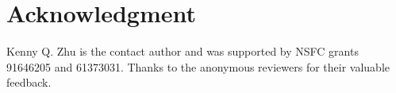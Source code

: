 \documentclass[11pt,a4paper]{article}
\begin{document}






%





\section*{Acknowledgment}
Kenny Q. Zhu is the contact author and was supported by NSFC grants
91646205 and 61373031. Thanks to the anonymous reviewers for their valuable
feedback.



\end{document}

